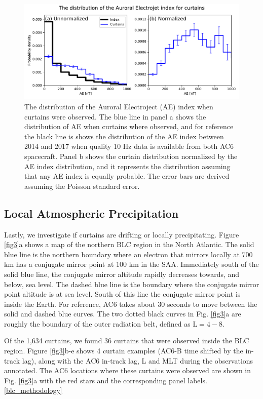 \documentclass[draft]{agujournal2019}
\begin{document}
\begin{figure}
\includegraphics[width=\textwidth]{fig4.pdf}
\caption{The distribution of the Auroral Electroject (AE) index when curtains were observed. The blue line in panel a shows the distribution of AE when curtains where observed, and for reference the black line is shows the distribution of the AE index between 2014 and 2017 when quality 10 Hz data is available from both AC6 spacecraft. Panel b shows the curtain distribution normalized by the AE index distribution, and it represents the distribution assuming that any AE index is equally probable. The error bars are derived assuming the Poisson standard error.}
\label{ae_dist}
\end{figure}

\subsection{Local Atmospheric Precipitation}
Lastly, we investigate if curtains are drifting or locally precipitating. Figure \ref{fig3}a shows a map of the northern BLC region in the North Atlantic. The solid blue line is the northern boundary where an electron that mirrors locally at 700 km has a conjugate mirror point at 100 km in the SAA. Immediately south of the solid blue line, the conjugate mirror altitude rapidly decreases towards, and below, sea level. The dashed blue line is the boundary where the conjugate mirror point altitude is at sea level. South of this line the conjugate mirror point is inside the Earth. For reference, AC6 takes about 30 seconds to move between the solid and dashed blue curves. The two dotted black curves in Fig. \ref{fig3}a are roughly the boundary of the outer radiation belt, defined as $\mathrm{L}=4-8$.

Of the 1,634 curtains, we found 36 curtains that were observed inside the BLC region. Figure \ref{fig3}b-e shows 4 curtain examples (AC6-B time shifted by the in-track lag), along with the AC6 in-track lag, L and MLT during the observations annotated. The AC6 locations where these curtains were observed are shown in Fig. \ref{fig3}a with the red stars and the corresponding panel labels.  \ref{blc_methodology} 
\end{document}
